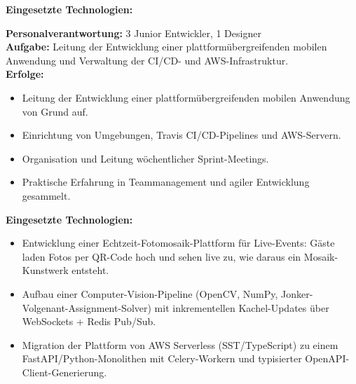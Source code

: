 \documentclass[10pt,a4paper,normalphoto]{altacv}
\begin{document}
\begin{fullwidth}
\textbf{Eingesetzte Technologien:}\\[0.4em]

\vspace{2em}

\textbf{Personalverantwortung:} 3 Junior Entwickler, 1 Designer\\
\textbf{Aufgabe:} Leitung der Entwicklung einer plattformübergreifenden mobilen Anwendung und Verwaltung der CI/CD- und AWS-Infrastruktur.\\
\textbf{Erfolge:}
\begin{itemize}
    \item Leitung der Entwicklung einer plattformübergreifenden mobilen Anwendung von Grund auf.
    \item Einrichtung von Umgebungen, Travis CI/CD-Pipelines und AWS-Servern.
    \item Organisation und Leitung wöchentlicher Sprint-Meetings.
    \item Praktische Erfahrung in Teammanagement und agiler Entwicklung gesammelt.
\end{itemize}

\textbf{Eingesetzte Technologien:}\\[0.4em]

\vspace{2em}

\newpage
{}

\begin{itemize}
    \item Entwicklung einer Echtzeit-Fotomosaik-Plattform für Live-Events: Gäste laden Fotos per QR-Code hoch und sehen live zu, wie daraus ein Mosaik-Kunstwerk entsteht.
    \item Aufbau einer Computer-Vision-Pipeline (OpenCV, NumPy, Jonker-Volgenant-Assignment-Solver) mit inkrementellen Kachel-Updates über WebSockets + Redis Pub/Sub.
    \item Migration der Plattform von AWS Serverless (SST/TypeScript) zu einem FastAPI/Python-Monolithen mit Celery-Workern und typisierter OpenAPI-Client-Generierung.
\end{itemize}


\end{fullwidth}
\end{document}
